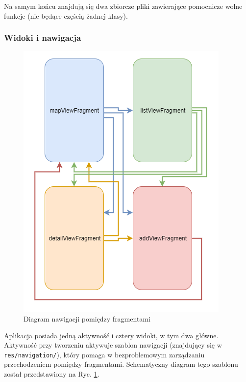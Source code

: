 \documentclass[polish,polish,a4paper,12pt]{article}
\begin{document}
		Na samym końcu znajdują się dwa zbiorcze pliki zawierające pomocnicze wolne funkcje (nie będące częścią żadnej klasy).

		\subsubsection{Widoki i nawigacja}

		\begin{figure}[H]
			\centering
			\includegraphics[width = \textwidth]{navigation}
			\caption{Diagram nawigacji pomiędzy fragmentami}
			\label{fig:navigation}
		\end{figure}

		Aplikacja posiada jedną aktywność i cztery widoki, w tym dwa główne. Aktywność przy tworzeniu aktywuje szablon nawigacji (znajdujący się w \texttt{res/navigation/}), który pomaga w bezproblemowym zarządzaniu przechodzeniem pomiędzy fragmentami. Schematyczny diagram tego szablonu został przedstawiony na Ryc. \ref{fig:navigation}.
\end{document}
